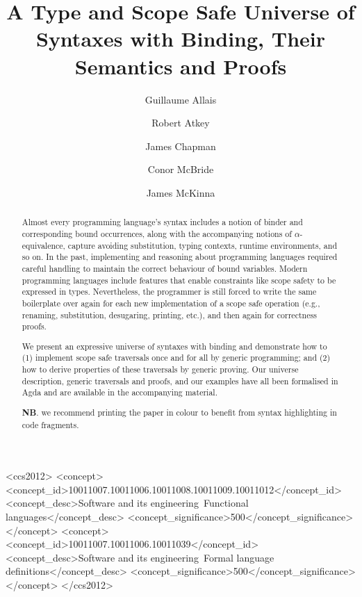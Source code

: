 \documentclass[format=acmsmall, screen=true]{acmart}
\begin{document}
\title[A Type and Scope Safe Universe of Syntaxes with Binding]{A Type and Scope Safe Universe of Syntaxes with Binding, Their Semantics and Proofs}
\author{Guillaume Allais}
\author{Robert Atkey}
\author{James Chapman}
\author{Conor McBride}
\author{James McKinna}

\begin{abstract}
Almost every programming language's syntax includes a notion of binder
and corresponding bound occurrences, along with the accompanying
notions of $\alpha$-equivalence, capture avoiding substitution, typing
contexts, runtime environments, and so on. In the past, implementing
and reasoning about programming languages required careful handling to
maintain the correct behaviour of bound variables. Modern programming
languages include features that enable constraints like scope safety
to be expressed in types. Nevertheless, the programmer is still forced
to write the same boilerplate over again for each new implementation
of a scope safe operation (e.g., renaming, substitution, desugaring,
printing, etc.), and then again for correctness proofs.

We present an expressive universe of syntaxes with binding and
demonstrate how to (1) implement scope safe traversals once and for
all by generic programming; and (2) how to derive properties of these
traversals by generic proving. Our universe description, generic
traversals and proofs, and our examples have all been formalised in
Agda and are available in the accompanying material.

\textbf{NB}. we recommend printing the paper in colour to benefit
from syntax highlighting in code fragments.
\end{abstract}


%
%
\begin{CCSXML}
<ccs2012>
<concept>
<concept_id>10011007.10011006.10011008.10011009.10011012</concept_id>
<concept_desc>Software and its engineering~Functional languages</concept_desc>
<concept_significance>500</concept_significance>
</concept>
<concept>
<concept_id>10011007.10011006.10011039</concept_id>
<concept_desc>Software and its engineering~Formal language definitions</concept_desc>
<concept_significance>500</concept_significance>
</concept>
</ccs2012>
\end{CCSXML}
\end{document}
